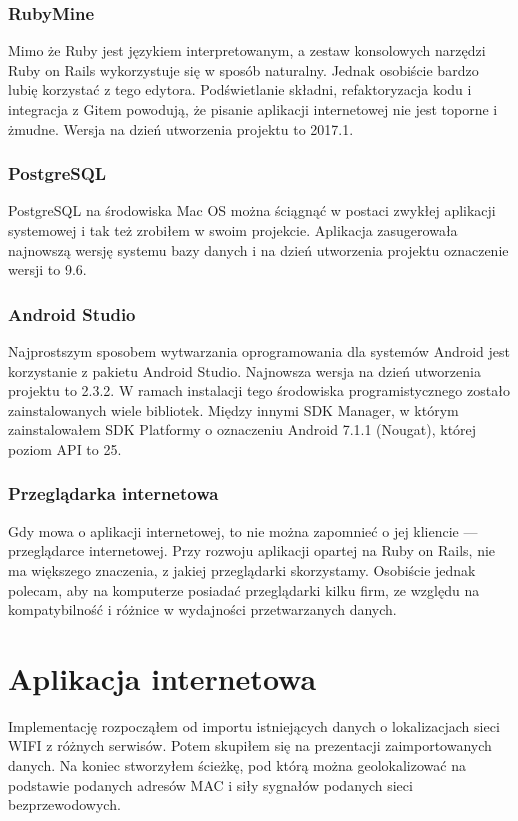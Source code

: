 \subsubsection{RubyMine}
Mimo że Ruby jest językiem interpretowanym, a zestaw konsolowych narzędzi Ruby on Rails wykorzystuje się w sposób naturalny. Jednak osobiście bardzo lubię korzystać z tego edytora. Podświetlanie składni, refaktoryzacja kodu i integracja z Gitem powodują, że pisanie aplikacji internetowej nie jest toporne i żmudne. Wersja na dzień utworzenia projektu to 2017.1.

\subsubsection{PostgreSQL}
PostgreSQL na środowiska Mac OS można ściągnąć w postaci zwykłej aplikacji systemowej i tak też zrobiłem w swoim projekcie. Aplikacja zasugerowała najnowszą wersję systemu bazy danych i na dzień utworzenia projektu oznaczenie wersji to 9.6.

\subsubsection{Android Studio}
Najprostszym sposobem wytwarzania oprogramowania dla systemów Android jest korzystanie z pakietu Android Studio. Najnowsza wersja na dzień utworzenia projektu to 2.3.2. W ramach instalacji tego środowiska programistycznego zostało zainstalowanych wiele bibliotek. Między innymi SDK Manager, w którym zainstalowałem SDK Platformy o oznaczeniu Android 7.1.1 (Nougat), której poziom API to 25.

\subsubsection{Przeglądarka internetowa}
Gdy mowa o aplikacji internetowej, to nie można zapomnieć o jej kliencie — przeglądarce internetowej. Przy rozwoju aplikacji opartej na Ruby on Rails, nie ma większego znaczenia, z jakiej przeglądarki skorzystamy. Osobiście jednak polecam, aby na komputerze posiadać przeglądarki kilku firm, ze względu na kompatybilność i różnice w wydajności przetwarzanych danych. 

\section{Aplikacja internetowa}
Implementację rozpocząłem od importu istniejących danych o lokalizacjach sieci WIFI z różnych serwisów. Potem skupiłem się na prezentacji zaimportowanych danych. Na koniec stworzyłem ścieżkę, pod którą można geolokalizować na podstawie podanych adresów MAC i siły sygnałów podanych sieci bezprzewodowych.

